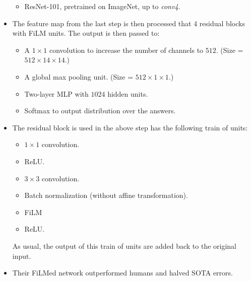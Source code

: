 \documentclass[10pt]{article}
\begin{document}
\begin{itemize}
\begin{itemize}
  		\item ResNet-101, pretrained on ImageNet, up to \emph{conv4}.
  	\end{itemize}

  	\item The feature map from the last step is then processed that 4 residual blocks with FiLM units. The output is then passed to:
  	\begin{itemize}
  		\item A $1 \times 1$ convolution to increase the number of channels to $512$. (Size = $512 \times 14 \times 14$.)

  		\item A global max pooling unit.  (Size = $512 \times 1 \times 1$.)

  		\item Two-layer MLP with $1024$ hidden units.

  		\item Softmax to output distribution over the answers.
  	\end{itemize}

  	\item The residual block is used in the above step has the following train of units:
  	\begin{itemize}
  		\item $1 \times 1$ convolution.
  		\item ReLU.
  		\item $3 \times 3$ convolution.
  		\item Batch normalization (without affine transformation).
  		\item FiLM
  		\item ReLU. 
  	\end{itemize}
  	As usual, the output of this train of units are added back to the original input.

  	\item Their FiLMed network outperformed humans and halved SOTA errors.

  \end{itemize}

  
    
\end{document}

